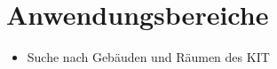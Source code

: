 \section{Anwendungsbereiche}

\begin{itemize}
	\item Suche nach Gebäuden und Räumen des \Gls{KIT}
\end{itemize}
